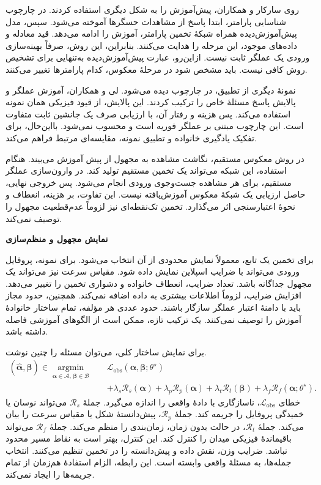 روی سارکار و همکاران، پیش‌آموزش را به شکل دیگری استفاده کردند.
در چارچوب شناسایی پارامتر، ابتدا پاسخ از مشاهدات حسگرها آموخته می‌شود.
سپس، مدل پیش‌آموزش‌دیده همراه شبکهٔ تخمین پارامتر، آموزش را ادامه می‌دهد.
قید معادله و داده‌های موجود، این مرحله را هدایت می‌کنند.
بنابراین، این روش، صرفاً بهینه‌سازی ورودی یک عملگر ثابت نیست.
ازاین‌رو، عبارت پیش‌آموزش‌دیده به‌تنهایی برای تشخیص روش کافی نیست.
باید مشخص شود در مرحلهٔ معکوس، کدام پارامترها تغییر می‌کنند.
\cite{RoySarkar2026HiddenPhysics}

نمونهٔ دیگری از تطبیق، در چارچوب  دیده می‌شود.
لی و همکاران، آموزش عملگر و پالایش پاسخ مسئلهٔ خاص را ترکیب کردند.
این پالایش، از قیود فیزیکی همان نمونه استفاده می‌کند.
پس هزینه و رفتار آن، با ارزیابی صرف یک جانشین ثابت متفاوت است.
این چارچوب مبتنی بر عملگر فوریه است و  محسوب نمی‌شود.
بااین‌حال، برای تفکیک یادگیری خانواده و تطبیق نمونه، مقایسه‌ای مرتبط فراهم می‌کند.
\cite{Li2024PINO}

در روش معکوس مستقیم، نگاشت مشاهده به مجهول از پیش آموزش می‌بیند.
هنگام استفاده، این شبکه می‌تواند یک تخمین مستقیم تولید کند.
در وارون‌سازی عملگر مستقیم، برای هر مشاهده جست‌وجوی ورودی انجام می‌شود.
پس خروجی نهایی، حاصل ارزیابی یک شبکهٔ معکوس آموزش‌یافته نیست.
این تفاوت، بر هزینه، انعطاف و نحوهٔ اعتبارسنجی اثر می‌گذارد.
تخمین تک‌نقطه‌ای نیز لزوماً عدم‌قطعیت مجهول را توصیف نمی‌کند.

\textbf{نمایش مجهول و منظم‌سازی}

برای تخمین یک تابع، معمولاً نمایش محدودی از آن انتخاب می‌شود.
برای نمونه، پروفایل ورودی می‌تواند با ضرایب اسپلاین نمایش داده شود.
مقیاس سرعت نیز می‌تواند یک مجهول جداگانه باشد.
تعداد ضرایب، انعطاف خانواده و دشواری تخمین را تغییر می‌دهد.
افزایش ضرایب، لزوماً اطلاعات بیشتری به داده اضافه نمی‌کند.
همچنین، حدود مجاز باید با دامنهٔ اعتبار عملگر سازگار باشند.
حدود عددی هر مؤلفه، تمام ساختار خانوادهٔ آموزش را توصیف نمی‌کنند.
یک ترکیب تازه، ممکن است از الگوهای آموزشی فاصله داشته باشد.

برای نمایش ساختار کلی، می‌توان مسئله را چنین نوشت.
\begin{equation}
\begin{aligned}
(\widehat{\boldsymbol\alpha},\widehat{\boldsymbol\beta})
\in\underset{\boldsymbol\alpha\in\mathcal A,\,
\boldsymbol\beta\in\mathcal B}{\operatorname{argmin}}\quad
&\mathcal L_{\mathrm{obs}}
(\boldsymbol\alpha,\boldsymbol\beta;\theta^\star)\\
&+\lambda_s\mathcal R_s(\boldsymbol\alpha)
+\lambda_p\mathcal R_p(\boldsymbol\alpha)
+\lambda_t\mathcal R_t(\boldsymbol\beta)
+\lambda_f\mathcal R_f(\boldsymbol\alpha;\theta^\star).
\end{aligned}
\label{eq:lit-frozen-regularized-inverse}
\end{equation}
خطای $\mathcal L_{\mathrm{obs}}$، ناسازگاری با دادهٔ واقعی را اندازه می‌گیرد.
جملهٔ $\mathcal R_s$ می‌تواند نوسان یا خمیدگی پروفایل را جریمه کند.
جملهٔ $\mathcal R_p$، پیش‌دانستهٔ شکل یا مقیاس سرعت را بیان می‌کند.
جملهٔ $\mathcal R_t$، در حالت بدون زمان، زمان‌بندی را منظم می‌کند.
جملهٔ $\mathcal R_f$ می‌تواند باقیماندهٔ فیزیکی میدان را کنترل کند.
این کنترل، بهتر است به نقاط مسیر محدود نباشد.
ضرایب وزن، نقش داده و پیش‌دانسته را در تخمین تنظیم می‌کنند.
انتخاب جمله‌ها، به مسئلهٔ واقعی وابسته است.
این رابطه، الزام استفادهٔ هم‌زمان از تمام جریمه‌ها را ایجاد نمی‌کند.

